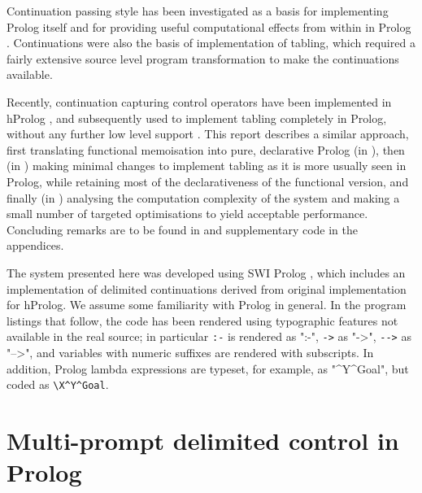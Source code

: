 Continuation passing style has been investigated as a basis for implementing Prolog itself
\citep{TarauDahl1994,Lindgren1994,Neumerkel1995} and for providing useful computational effects
from within in Prolog \citep{TarauDahl1994a,TarauDahl1998}. 
Continuations were also the basis of  
implementation of tabling, which required a fairly extensive source level program
transformation to make the continuations available.

Recently, continuation capturing control operators have been implemented in hProlog 
\citep{SchrijversDemoenDesouter2013}, and subsequently used to implement
tabling completely in Prolog, without any further low level support 
\citep{DesouterVan-DoorenSchrijvers2015}. This report describes a similar approach, first
translating  functional memoisation into pure, declarative Prolog (in ),
then (in ) making minimal changes to implement tabling as it is more usually seen in Prolog,
while retaining most of the declarativeness of the functional version, and finally (in ) analysing
the computation complexity of the system and making a small
number of targeted optimisations to yield acceptable performance. Concluding remarks are to be found
in  and supplementary code in the appendices.

The system presented here was developed using SWI Prolog \citep{WielemakerSchrijversTriska2012},
which includes an implementation of delimited continuations
derived from  original implementation for hProlog.
We assume some familiarity with Prolog in general. In the program listings that follow, the code
has been rendered using typographic features not available in the real source; in particular
\verb|:-| is rendered as ":-", \verb|->| as "->", \verb|-->| as "-->", and variables with numeric suffixes
are rendered with subscripts. In addition, Prolog lambda expressions \citep{Neumerkel2009} are typeset, for example,
as "\X^Y^Goal", but coded as \verb|\X^Y^Goal|.

\section{Multi-prompt delimited control in Prolog}

